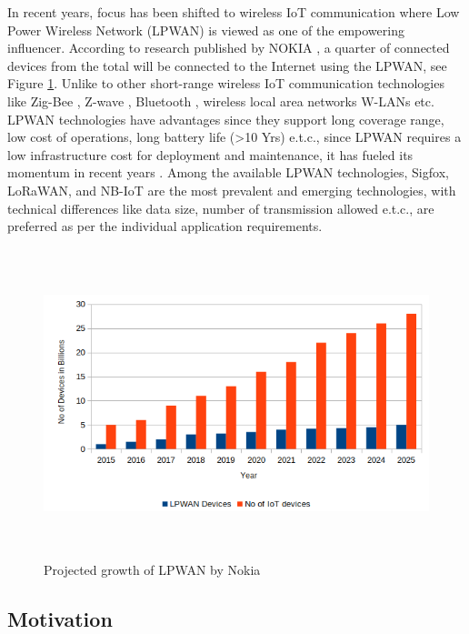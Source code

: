 \documentclass[12pt]{article}
\begin{document}
In recent years, focus has been shifted to wireless IoT communication where Low Power Wireless Network (LPWAN) is viewed as one of the empowering influencer. According to research published by NOKIA \cite{nokiaresource}, a quarter of connected devices from the total will be connected to the Internet using the LPWAN, see Figure \ref{fig:Projected Growth of LPWAN}. Unlike to other short-range wireless IoT communication technologies like Zig-Bee \cite{zigbeeAliance}, Z-wave \cite{zwave}, Bluetooth \cite{bluetooth}, wireless local area networks W-LANs etc. LPWAN technologies have advantages since they support long coverage range, low cost of operations, long battery life (>10 Yrs) e.t.c., since LPWAN requires a low infrastructure cost for deployment and maintenance, it has fueled its momentum in recent years \cite{gomez2019sigfox}. Among the available LPWAN technologies, Sigfox, LoRaWAN, and  NB-IoT are the most prevalent and emerging technologies, with technical differences like data size, number of transmission allowed e.t.c., are preferred as per the individual application requirements.\par

\begin{figure}[h!]
  \includegraphics[width=\linewidth,height=9cm]{Images/LPWAN_growth.png}
  \centering
  \caption{Projected growth of LPWAN by Nokia \cite{nokiaresource}}
  \label{fig:Projected Growth of LPWAN}
\end{figure}
\newpage

\subsection{Motivation}\label{motivation}
\end{document}
